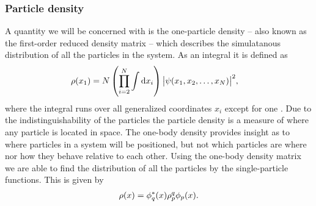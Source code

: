             \subsubsection{Particle density}
                A quantity we will be concerned with is the one-particle density
                -- also known as the first-order reduced density matrix -- which
                describes the simulatanous distribution of all the particles in
                the system.
                As an integral it is defined as
                \begin{align}
                    \rho(x_1)
                    &= N\left( \prod_{i = 2}^{N} \int \dd x_i \right)
                    \abs{\psi(x_1, x_2, \dots, x_N)}^2,
                \end{align}
                where the integral runs over all generalized coordinates $x_i$
                except for one \cite{lowdin-density-matrices,
                hogberget2013quantum}.
                Due to the indistinguishability of the particles the particle
                density is a measure of where any particle is located in space.
                The one-body density provides insight as to where particles in a
                system will be positioned, but not which particles are where nor
                how they behave relative to each other.
                Using the one-body density matrix we are able to find the
                distribution of all the particles by the single-particle
                functions.
                This is given by
                \begin{align}
                    \rho(x)
                    =
                    \phi^{*}_q(x) \rho^{q}_{p} \phi_p(x).
                \end{align}

